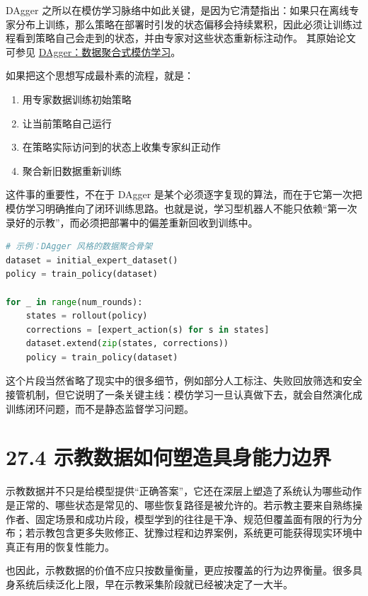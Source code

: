 DAgger 之所以在模仿学习脉络中如此关键，是因为它清楚指出：如果只在离线专家分布上训练，那么策略在部署时引发的状态偏移会持续累积，因此必须让训练过程看到策略自己会走到的状态，并由专家对这些状态重新标注动作。 其原始论文可参见 \href{https://proceedings.mlr.press/v15/ross11a.html}{DAgger：数据聚合式模仿学习}。

如果把这个思想写成最朴素的流程，就是：

\begin{enumerate}
\item 用专家数据训练初始策略
\item 让当前策略自己运行
\item 在策略实际访问到的状态上收集专家纠正动作
\item 聚合新旧数据重新训练
\end{enumerate}

这件事的重要性，不在于 DAgger 是某个必须逐字复现的算法，而在于它第一次把模仿学习明确推向了闭环训练思路。也就是说，学习型机器人不能只依赖“第一次录好的示教”，而必须把部署中的偏差重新回收到训练中。

\begin{lstlisting}[language=python]
# 示例：DAgger 风格的数据聚合骨架
dataset = initial_expert_dataset()
policy = train_policy(dataset)

for _ in range(num_rounds):
    states = rollout(policy)
    corrections = [expert_action(s) for s in states]
    dataset.extend(zip(states, corrections))
    policy = train_policy(dataset)
\end{lstlisting}

这个片段当然省略了现实中的很多细节，例如部分人工标注、失败回放筛选和安全接管机制，但它说明了一条关键主线：模仿学习一旦认真做下去，就会自然演化成训练闭环问题，而不是静态监督学习问题。

\section*{27.4 示教数据如何塑造具身能力边界}


示教数据并不只是给模型提供“正确答案”，它还在深层上塑造了系统认为哪些动作是正常的、哪些状态是常见的、哪些恢复路径是被允许的。若示教主要来自熟练操作者、固定场景和成功片段，模型学到的往往是干净、规范但覆盖面有限的行为分布；若示教包含更多失败修正、犹豫过程和边界案例，系统更可能获得现实环境中真正有用的恢复性能力。

也因此，示教数据的价值不应只按数量衡量，更应按覆盖的行为边界衡量。很多具身系统后续泛化上限，早在示教采集阶段就已经被决定了一大半。

